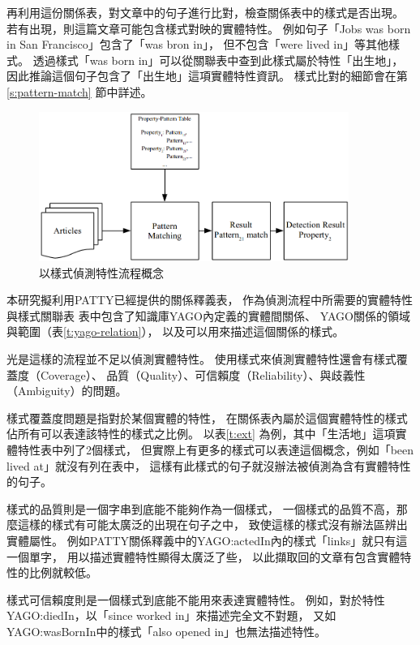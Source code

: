 再利用這份關係表，對文章中的句子進行比對，檢查關係表中的樣式是否出現。
若有出現，則這篇文章可能包含樣式對映的實體特性。
例如句子「Jobs was born in San Francisco」包含了「was bron in」，
但不包含「were lived in」等其他樣式。
透過樣式「was born in」可以從關聯表中查到此樣式屬於特性「出生地」，
因此推論這個句子包含了「出生地」這項實體特性資訊。
樣式比對的細節會在第\ref{s:pattern-match} 節中詳述。

\begin{figure}
    \centering
    \includegraphics[width=0.9\textwidth]{images/03-process-v1}
    \caption{以樣式偵測特性流程概念}
    \label{i:process-v1}
\end{figure}

本研究擬利用PATTY已經提供的關係釋義表，
作為偵測流程中所需要的實體特性與樣式關聯表
表中包含了知識庫YAGO內定義的實體間關係、
YAGO關係的領域與範圍（表\ref{t:yago-relation}），
以及可以用來描述這個關係的樣式。



光是這樣的流程並不足以偵測實體特性。
使用樣式來偵測實體特性還會有樣式覆蓋度（Coverage）、
品質（Quality）、可信賴度（Reliability）、與歧義性（Ambiguity）的問題。

樣式覆蓋度問題是指對於某個實體的特性，
在關係表內屬於這個實體特性的樣式佔所有可以表達該特性的樣式之比例。
以表\ref{t:ext} 為例，其中「生活地」這項實體特性表中列了2個樣式，
但實際上有更多的樣式可以表達這個概念，例如「been lived at」就沒有列在表中，
這樣有此樣式的句子就沒辦法被偵測為含有實體特性的句子。

樣式的品質則是一個字串到底能不能夠作為一個樣式，    %
一個樣式的品質不高，那麼這樣的樣式有可能太廣泛的出現在句子之中，
致使這樣的樣式沒有辦法區辨出實體屬性。
例如PATTY關係釋義中的YAGO:actedIn內的樣式「links」就只有這一個單字，
用以描述實體特性顯得太廣泛了些，
以此擷取回的文章有包含實體特性的比例就較低。

樣式可信賴度則是一個樣式到底能不能用來表達實體特性。
例如，對於特性YAGO:diedIn，以「since worked in」來描述完全文不對題，
又如YAGO:wasBornIn中的樣式「also opened in」也無法描述特性。

